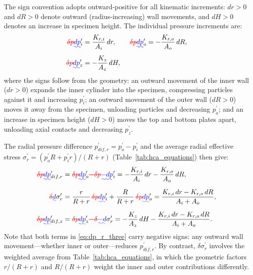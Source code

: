 \documentclass[a4paper,fleqn]{cas-sc}
\makeatletter
\providecommand{\DIFadd}[1]{{\protect\color{blue}\uwave{#1}}} %
\providecommand{\DIFdel}[1]{{\protect\color{red}\sout{#1}}} %
\providecommand{\DIFaddbegin}{} %
\providecommand{\DIFaddend}{} %
\providecommand{\DIFdelbegin}{} %
\providecommand{\DIFdelend}{} %
\let\sout@orig\sout %
\renewcommand{\sout}[1]{\ifmmode\text{\sout@orig{\ensuremath{#1}}}\else\sout@orig{#1}\fi} %
\makeatother
\begin{document}
The sign convention adopts outward-positive for all kinematic increments: $dr>0$ and $dR>0$ denote outward (radius-increasing) wall movements, and $dH>0$ denotes an increase in specimen height. The individual pressure increments are:
\begin{align}
\DIFdelbegin \DIFdel{\delta p}\DIFdelend \DIFaddbegin \DIFadd{dp}\DIFaddend _i^{\prime} &= \frac{K_{r,i}}{A_i}\,dr,\qquad
\DIFdelbegin \DIFdel{\delta p}\DIFdelend \DIFaddbegin \DIFadd{dp}\DIFaddend _o^{\prime} = -\frac{K_{r,o}}{A_o}\,dR, \label{eq:dp_individual_r}\\[4pt]
\DIFdelbegin \DIFdel{\delta p}\DIFdelend \DIFaddbegin \DIFadd{dp}\DIFaddend _z^{\prime} &= -\frac{K_z}{A_z}\,dH, \label{eq:dp_individual_z}
\end{align}
where the signs follow from the geometry: an outward movement of the inner wall ($dr>0$) expands the inner cylinder into the specimen, compressing particles against it and increasing $p_i^{\prime}$; an outward movement of the outer wall ($dR>0$) moves it away from the specimen, unloading particles and decreasing $p_o^{\prime}$; and an increase in specimen height ($dH>0$) moves the top and bottom plates apart, unloading axial contacts and decreasing $p_z^{\prime}$.

The radial pressure difference $p_{dif,r}^{\prime}=p_o^{\prime}-p_i^{\prime}$ and the average radial effective stress $\sigma_r^{\prime}=({p_o^{\prime}R+p_i^{\prime}r})/({R+r})$ (Table~\ref{tab:hca_equations}) then give:
\begin{align}
\DIFdelbegin \DIFdel{\delta p}\DIFdelend \DIFaddbegin \DIFadd{dp}\DIFaddend _{dif,r}^{\prime}
  &= \DIFdelbegin \DIFdel{\delta p}\DIFdelend \DIFaddbegin \DIFadd{dp}\DIFaddend _o^{\prime}\DIFdelbegin \DIFdel{-\delta p}\DIFdelend \DIFaddbegin \DIFadd{-dp}\DIFaddend _i^{\prime}
   = -\frac{K_{r,i}}{A_i}\,dr - \frac{K_{r,o}}{A_o}\,dR, \label{eq:dp_r_three}\\[6pt]
\DIFdelbegin \DIFdel{\delta}\DIFdelend \DIFaddbegin \DIFadd{d}\DIFaddend \sigma_r^{\prime}
  &= \frac{r}{R+r}\,\DIFdelbegin \DIFdel{\delta p}\DIFdelend \DIFaddbegin \DIFadd{dp}\DIFaddend _i^{\prime} + \frac{R}{R+r}\,\DIFdelbegin \DIFdel{\delta p}\DIFdelend \DIFaddbegin \DIFadd{dp}\DIFaddend _o^{\prime}
   = \frac{K_{r,i}\,dr - K_{r,o}\,dR}{A_i+A_o}, \label{eq:dsigma_r_three}\\[6pt]
\DIFdelbegin \DIFdel{\delta p}\DIFdelend \DIFaddbegin \DIFadd{dp}\DIFaddend _{dif,z}^{\prime}
  &= \DIFdelbegin \DIFdel{\delta p}\DIFdelend \DIFaddbegin \DIFadd{dp}\DIFaddend _z^{\prime}\DIFdelbegin \DIFdel{-\delta}\DIFdelend \DIFaddbegin \DIFadd{-d}\DIFaddend \sigma_r^{\prime}
   = -\frac{K_z}{A_z}\,dH - \frac{K_{r,i}\,dr - K_{r,o}\,dR}{A_i+A_o}. \label{eq:dp_z_three}
\end{align}
Note that both terms in \cref{eq:dp_r_three} carry negative signs: any outward wall movement---whether inner or outer---reduces $p_{dif,r}^{\prime}$. By contrast, \DIFdelbegin \DIFdel{$\delta\sigma_r^{\prime}$ }\DIFdelend \DIFaddbegin \DIFadd{$d\sigma_r^{\prime}$ }\DIFaddend involves the weighted average from Table~\ref{tab:hca_equations}, in which the geometric factors $r/(R+r)$ and $R/(R+r)$ weight the inner and outer contributions differently.
\end{document}
